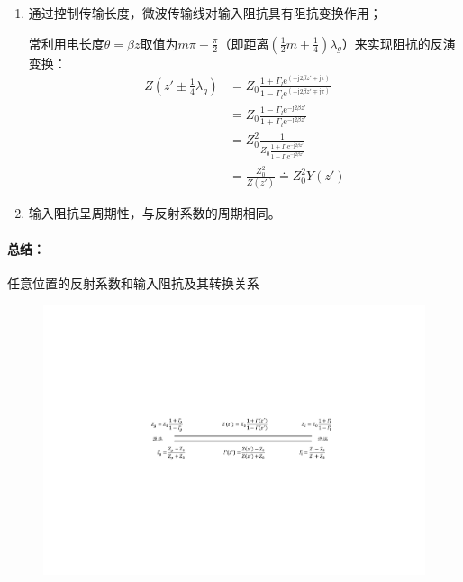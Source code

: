     \begin{enumerate}
        \item 通过控制传输长度，微波传输线对输入阻抗具有阻抗变换作用；


        常利用电长度$\theta=\beta z$取值为$m\pi+\frac{\pi}{2}$（即距离$(\frac{1}{2}m+\frac{1}{4})\lambda_g$）来实现阻抗的反演变换：
        \begin{align*}
            Z(z'\pm\frac{1}{4}\lambda_g)
            &=Z_0\frac{1+\varGamma_l \mathrm{e}^{(-\mathrm{j}2\beta z'\mp\mathrm{j}\pi)}}{1- \varGamma_l \mathrm{e}^{(-\mathrm{j}2\beta z'\mp\mathrm{j}\pi)}}\\
            &=Z_0\frac{1-\varGamma_l \mathrm{e}^{-\mathrm{j}2\beta z'}}{1+\varGamma_l \mathrm{e}^{-\mathrm{j}2\beta z'}}\\
            &=Z_0^2 \frac{1}{Z_0\frac{1+\varGamma_l \mathrm{e}^{-\mathrm{j}2\beta z'}}{1-\varGamma_l \mathrm{e}^{-\mathrm{j}2\beta z'}}}\\
            &=\frac{Z_0^2}{Z(z')}\doteq Z_0^2Y(z')
        \end{align*}
        \item 输入阻抗呈周期性，与反射系数的周期相同。

    \end{enumerate}

    \paragraph{总结：}任意位置的反射系数和输入阻抗及其转换关系
    \begin{figure}[htp]
        \centering
        \includegraphics[width=14cm]{figure/1-1.pdf}
    \end{figure}

